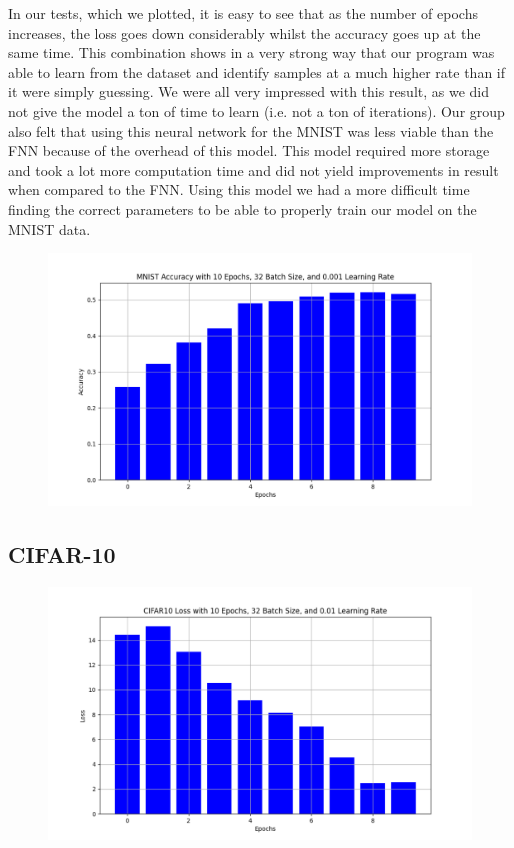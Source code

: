 \documentclass{article}
\begin{document}
In our tests, which we plotted, it is easy to see that as the number of epochs increases, the loss goes down considerably whilst the accuracy goes up at the same time. This combination shows in a very strong way that our program was able to learn from the dataset and identify samples at a much higher rate than if it were simply guessing. We were all very impressed with this result, as we did not give the model a ton of time to learn (i.e. not a ton of iterations). Our group also felt that using this neural network for the MNIST was less viable than the FNN because of the overhead of this model. This model required more storage and took a lot more computation time and did not yield improvements in result when compared to the FNN. Using this model we had a more difficult time finding the correct parameters to be able to properly train our model on the MNIST data.

\begin{figure}[!h]
    \centering
    \includegraphics[width=0.75\linewidth]{figs/MNIST A 10-32-0.001.png}
\end{figure}

\subsection{CIFAR-10}

\begin{figure}[!h]
    \centering
    \includegraphics[width=0.75\linewidth]{figs/CIFAR L 10-32-0.01.png}
\end{figure}
\end{document}
